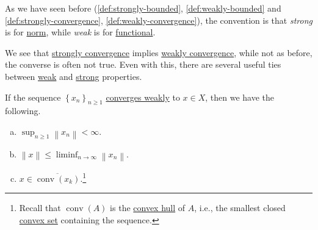 \begin{remark}
	As we have seen before (\autoref{def:strongly-bounded}, \autoref{def:weakly-bounded} and \autoref{def:strongly-convergence}, \autoref{def:weakly-convergence}), the convention is that \emph{strong} is for \hyperref[def:norm]{norm}, while \emph{weak} is for \hyperref[def:linear-functional]{functional}.
\end{remark}

We see that \hyperref[def:strongly-convergence]{strongly convergence} implies \hyperref[def:weakly-convergence]{weakly convergence}, while not as before, the converse is often not true. Even with this, there are several useful ties between \hyperref[def:weakly-convergence]{weak} and \hyperref[def:strongly-convergence]{strong} properties.

\begin{proposition}\label{prop:lec16}
	If the sequence \(\left\{ x_n \right\} _{n\geq 1}\) \hyperref[def:weakly-convergence]{converges weakly} to \(x\in X\), then we have the following.
	\begin{enumerate}[(a)]
		\item \(\sup _{n \geq 1} \left\lVert x_n\right\rVert < \infty \).
		\item \(\left\lVert x\right\rVert \leq \liminf_{n \to \infty} \left\lVert x_n\right\rVert \).
		\item \(x\in \overline{\mathop{\mathrm{conv}}(x_k)}\).\footnote{Recall that \(\mathop{\mathrm{conv}}(A)\) is the \href{https://en.wikipedia.org/wiki/Convex_hull}{convex hull} of \(A\), i.e., the smallest closed \hyperref[def:convex-set]{convex set} containing the sequence.}
	\end{enumerate}
\end{proposition}
